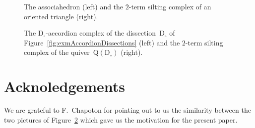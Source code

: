 \documentclass{amsart}
\theoremstyle{definition}
\newcommand{\fref}[1]{Figure~\ref{#1}} %
\newcommand{\dissection}{\mathrm{D}} %
\newcommand{\quiver}{\mathrm{Q}} %
\begin{document}
\begin{figure}
	\capstart
	\centerline{\associahedronAccordionTikz{}\associahedronSiltingTikz{}}
	\caption{The associahedron (left) and the $2$-term silting complex of an oriented triangle (right).}
	\label{fig:associahedron}
\end{figure}

\begin{figure}
	\capstart
	\centerline{\accordiohedronAccordionTikz{}\accordiohedronSiltingTikz{}}
	\caption{The $\dissection_\circ$-accordion complex of the dissection~$\dissection_\circ$ of \fref{fig:exmAccordionDissections} (left) and the $2$-term silting complex of the quiver~$\quiver(\dissection_\circ)$ (right).}
	\label{fig:accordiohedron}
\end{figure}





\section*{Acknoledgements}

We are grateful to F.~Chapoton for pointing out to us the similarity between the two pictures of \fref{fig:accordiohedron} which gave us the motivation for the present paper.




\label{sec:biblio}
\end{document}
